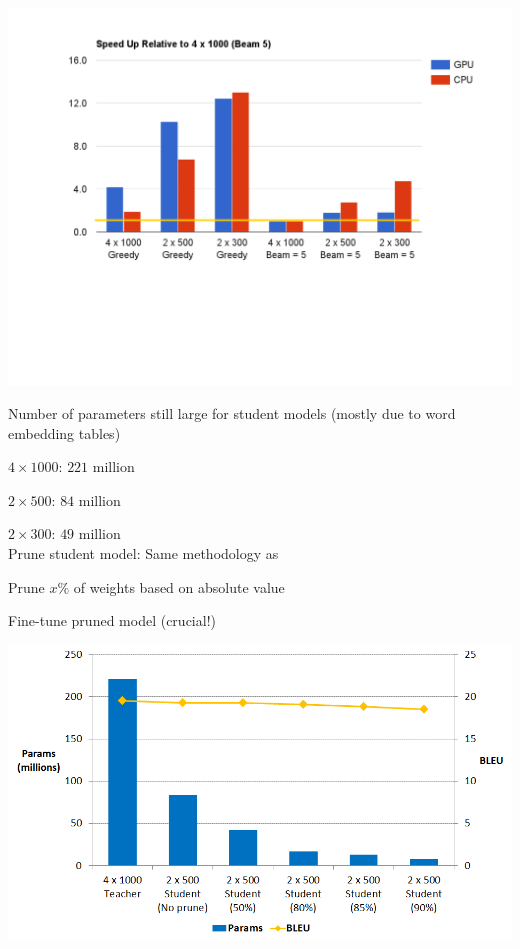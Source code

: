 \documentclass{beamer}
\let\tempone\itemize
\let\temptwo\enditemize
\renewenvironment{itemize}{\tempone\addtolength{\itemsep}{0.5\baselineskip}}{\temptwo}
\newcommand{\air}{\vspace{0.25cm}}
\begin{document}
\begin{frame}
\centerline{}
\center
\vspace{-5mm}
\includegraphics[scale=0.44]{dec-speed.pdf}
\end{frame}


\begin{frame}
\centerline{}
\air
\air
Number of parameters still large for student models (mostly due to word embedding tables)
\begin{itemize}
\item $4 \times 1000$: $221$ million
\item $2 \times 500$: $84$ million
\item $2 \times 300$: $49$ million
\end{itemize}
\\ \air
\pause
Prune student model: Same methodology as \cite{See2016}
\begin{itemize}
\item Prune $x\%$ of weights based on absolute value
\item Fine-tune pruned model (crucial!)
\end{itemize}
\end{frame}

\begin{frame}
\centerline{}
\air
\air
\includegraphics[scale=0.4]{size}
\end{frame}
\end{document}
